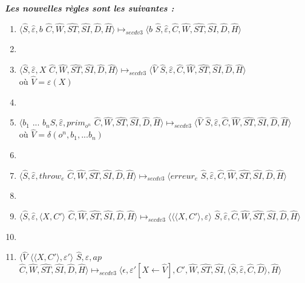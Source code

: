 \documentclass[10pt,a4paper]{article}
\begin{document}
				\textbf{\textit{Les nouvelles règles sont les suivantes :}}
				\smallbreak
				\begin{enumerate}
					\item $\langle\widehat{S},\widehat{\varepsilon},b$ $\widehat{C},\widehat{W},\widehat{ST},\widehat{SI},\widehat{D},\widehat{H}\rangle \longmapsto_{secdv3} \langle b$ $\widehat{S},\widehat{\varepsilon},\widehat{C},\widehat{W},\widehat{ST},\widehat{SI},\widehat{D},\widehat{H}\rangle$
					\item[]
					\item $\langle\widehat{S},\widehat{\varepsilon},X$ $\widehat{C},\widehat{W},\widehat{ST},\widehat{SI},\widehat{D},\widehat{H}\rangle \longmapsto_{secdv3} \langle \widehat{V}$ $\widehat{S},\widehat{\varepsilon},\widehat{C},\widehat{W},\widehat{ST},\widehat{SI},\widehat{D},\widehat{H}\rangle$
					\\où $\widehat{V} = \varepsilon(X)$
					\item[]
					\item $\langle b_{1}$ $...$ $b_{n}\widehat{S},\widehat{\varepsilon},prim_{o^{n}}$ $\widehat{C},\widehat{W},\widehat{ST},\widehat{SI},\widehat{D},\widehat{H}\rangle \longmapsto_{secdv3} \langle \widehat{V}$ $\widehat{S},\widehat{\varepsilon},\widehat{C},\widehat{W},\widehat{ST},\widehat{SI},\widehat{D},\widehat{H}\rangle$ 
					\\où $\widehat{V} = \delta(o^{n},b_1,...b_{n})$
					\item[]
					\item $\langle\widehat{S},\widehat{\varepsilon},throw_{e}$ $\widehat{C},\widehat{W},\widehat{ST},\widehat{SI},\widehat{D},\widehat{H}\rangle \longmapsto_{secdv3} \langle erreur_{e}$ $\widehat{S},\widehat{\varepsilon},\widehat{C},\widehat{W},\widehat{ST},\widehat{SI},\widehat{D},\widehat{H}\rangle$
					\item[]
					\item $\langle\widehat{S},\widehat{\varepsilon},\langle X,C'\rangle$ $\widehat{C},\widehat{W},\widehat{ST},\widehat{SI},\widehat{D},\widehat{H}\rangle \longmapsto_{secdv3} \langle\langle\langle X,C'\rangle,\varepsilon\rangle$ $\widehat{S},\widehat{\varepsilon},\widehat{C},\widehat{W},\widehat{ST},\widehat{SI},\widehat{D},\widehat{H}\rangle$
					\item[]
					\item $\langle\widehat{V}$ $\langle\langle X,C'\rangle,\varepsilon'\rangle$ $\widehat{S},\widehat{\varepsilon},ap$ $\widehat{C},\widehat{W},\widehat{ST},\widehat{SI},\widehat{D},\widehat{H}\rangle \longmapsto_{secdv3} \langle\epsilon,\varepsilon'[X \leftarrow \widehat{V}],C',\widehat{W},\widehat{ST},\widehat{SI},\langle\widehat{S},\widehat{\varepsilon},\widehat{C},\widehat{D}\rangle,\widehat{H}\rangle$

\end{enumerate}
\end{document}
